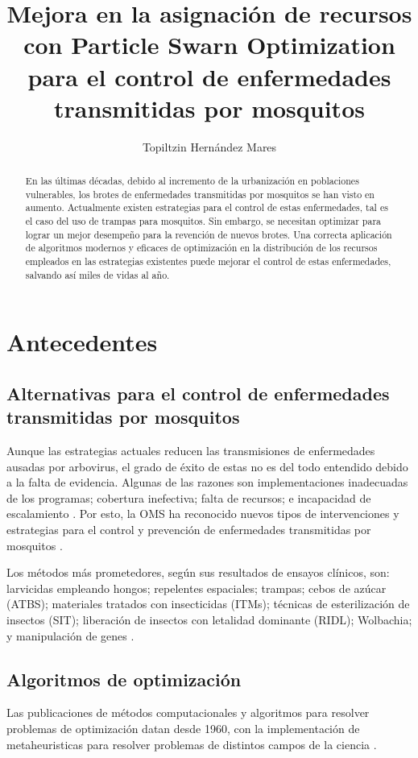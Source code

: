 \documentclass[letterpaper, 10pt, conference]{ieeeconf}
\title{\bf
  Mejora en la asignación de recursos con Particle Swarn Optimization para el
  control de enfermedades transmitidas por mosquitos
}
\author{Topiltzin Hernández Mares}
\begin{document}
\maketitle
\thispagestyle{empty}
\pagestyle{empty}

\begin{abstract}
  En las últimas décadas, debido al incremento de la urbanización en
  poblaciones vulnerables, los brotes de enfermedades transmitidas por
  mosquitos se han visto en aumento.
  Actualmente existen estrategias para el control de estas enfermedades, tal es
  el caso del uso de trampas para mosquitos.
  Sin embargo, se necesitan optimizar para lograr un mejor desempeño para la 
  revención de nuevos brotes.
  Una correcta aplicación de algoritmos modernos y eficaces de optimización en
  la distribución de los recursos empleados en las estrategias existentes puede
  mejorar el control de estas enfermedades, salvando así miles de vidas al año.
\end{abstract}

\section{Antecedentes}

\subsection{
  Alternativas para el control de enfermedades transmitidas por mosquitos
}
  Aunque las estrategias actuales reducen las transmisiones de enfermedades 
  ausadas por arbovirus, el grado de éxito de estas no es del todo entendido
  debido a la falta de evidencia.
  Algunas de las razones son implementaciones inadecuadas de los programas;
  cobertura inefectiva; falta de recursos; e incapacidad de escalamiento
  \cite{AltStrategies}.
  Por esto, la OMS ha reconocido nuevos tipos de intervenciones y estrategias
  para el control y prevención de enfermedades transmitidas por mosquitos
  \cite{WHOOverviewVCAG}.

  Los métodos más prometedores, según sus resultados de ensayos clínicos, son:
  larvicidas empleando hongos; repelentes espaciales; trampas; cebos de azúcar
  (ATBS); materiales tratados con insecticidas (ITMs); técnicas de
  esterilización de insectos (SIT); liberación de insectos con letalidad
  dominante (RIDL); Wolbachia; y manipulación de genes \cite{AltStrategies}.

\subsection{Algoritmos de optimización}
  Las publicaciones de métodos computacionales y algoritmos para resolver
  problemas de optimización datan desde 1960, con la implementación de
  metaheuristicas para resolver problemas de distintos campos de la ciencia
  \cite{SwarmVsEvol}.
\end{document}
